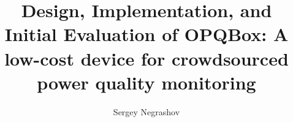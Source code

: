 \documentclass[11pt]{article}
\title{Design, Implementation, and Initial Evaluation of OPQBox: A low-cost device for crowdsourced power quality monitoring}
\author{Sergey Negrashov}
\begin{document}
\maketitle




\tableofcontents
\newpage
\listoffigures



\newpage
\appendix



\nocite{*}



%
\end{document}
